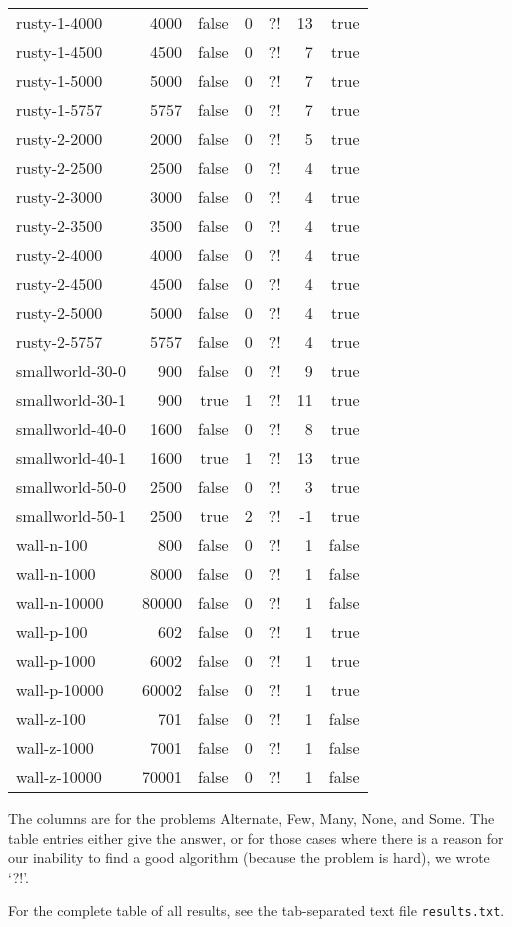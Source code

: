 \documentclass{tufte-handout}
\begin{document}
\begin{longtable}{lrrrrrr}
rusty-1-4000&4000&false&0&?!&13&true\\ 
rusty-1-4500&4500&false&0&?!&7&true\\ 
rusty-1-5000&5000&false&0&?!&7&true\\ 
rusty-1-5757&5757&false&0&?!&7&true\\ 
rusty-2-2000&2000&false&0&?!&5&true\\ 
rusty-2-2500&2500&false&0&?!&4&true\\ 
rusty-2-3000&3000&false&0&?!&4&true\\ 
rusty-2-3500&3500&false&0&?!&4&true\\ 
rusty-2-4000&4000&false&0&?!&4&true\\ 
rusty-2-4500&4500&false&0&?!&4&true\\ 
rusty-2-5000&5000&false&0&?!&4&true\\ 
rusty-2-5757&5757&false&0&?!&4&true\\ 
smallworld-30-0&900&false&0&?!&9&true\\ 
smallworld-30-1&900&true&1&?!&11&true\\ 
smallworld-40-0&1600&false&0&?!&8&true\\ 
smallworld-40-1&1600&true&1&?!&13&true\\ 
smallworld-50-0&2500&false&0&?!&3&true\\ 
smallworld-50-1&2500&true&2&?!&-1&true\\ 
wall-n-100&800&false&0&?!&1&false\\ 
wall-n-1000&8000&false&0&?!&1&false\\ 
wall-n-10000&80000&false&0&?!&1&false\\ 
wall-p-100&602&false&0&?!&1&true\\ 
wall-p-1000&6002&false&0&?!&1&true\\ 
wall-p-10000&60002&false&0&?!&1&true\\ 
wall-z-100&701&false&0&?!&1&false\\ 
wall-z-1000&7001&false&0&?!&1&false\\ 
wall-z-10000&70001&false&0&?!&1&false\\ 

  \bottomrule
\end{longtable}
\medskip

The columns are for the problems Alternate, Few, Many, None, and Some.
The table entries either give the answer, or for those cases where there is a reason for our inability to find a good algorithm (because the problem is hard), we wrote `?!'.

For the complete table of all results, see the tab-separated text file {\tt results.txt}.
\end{document}

